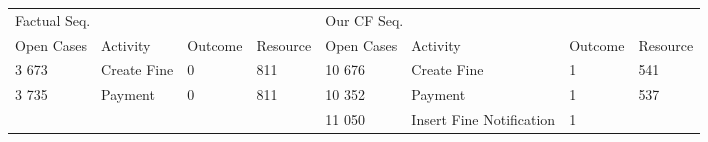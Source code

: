\begin{tabular}{llllllll}
\toprule
\multicolumn{4}{l}{Factual Seq.} & \multicolumn{4}{l}{Our CF Seq.} \\
Open Cases & Activity & Outcome & Resource & Open Cases & Activity & Outcome & Resource \\
\midrule
3 673 & Create Fine & 0 & 811 & 10 676 & Create Fine & 1 & 541 \\
3 735 & Payment & 0 & 811 & 10 352 & Payment & 1 & 537 \\
 &  &  &  & 11 050 & Insert Fine Notification & 1 &  \\
\bottomrule
\end{tabular}
